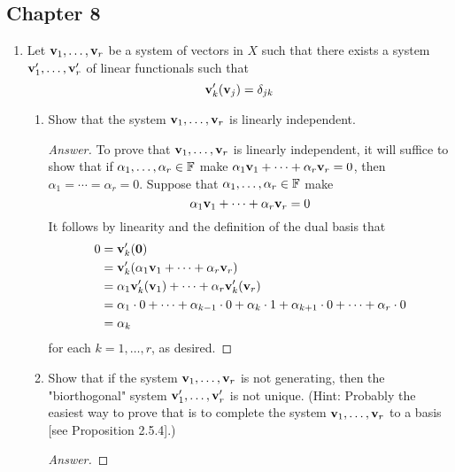 \documentclass[../psets.tex]{subfiles}
\begin{document}
\subsection*{Chapter 8}
\begin{enumerate}[label={\textbf{1.\arabic*.}}]
    \item Let $\mathbf{v}_1,\dots,\mathbf{v}_r$ be a system of vectors in $X$ such that there exists a system $\mathbf{v}_1',\dots,\mathbf{v}_r'$ of linear functionals such that
    \begin{equation*}
        \mathbf{v}_k'(\mathbf{v}_j) = \delta_{jk}
    \end{equation*}
    \begin{enumerate}
        \item Show that the system $\mathbf{v}_1,\dots,\mathbf{v}_r$ is linearly independent.
        \begin{proof}[Answer]
            To prove that $\mathbf{v}_1,\dots,\mathbf{v}_r$ is linearly independent, it will suffice to show that if $\alpha_1,\dots,\alpha_r\in\mathbb{F}$ make $\alpha_1\mathbf{v}_1+\cdots+\alpha_r\mathbf{v}_r=0$, then $\alpha_1=\cdots=\alpha_r=0$. Suppose that $\alpha_1,\dots,\alpha_r\in\mathbb{F}$ make
            \begin{equation*}
                \alpha_1\mathbf{v}_1+\cdots+\alpha_r\mathbf{v}_r = 0
            \end{equation*}
            It follows by linearity and the definition of the dual basis that
            \begin{align*}
                0 &= \mathbf{v}_k'(\bm{0})\\
                &= \mathbf{v}_k'(\alpha_1\mathbf{v}_1+\cdots+\alpha_r\mathbf{v}_r)\\
                &= \alpha_1\mathbf{v}_k'(\mathbf{v}_1)+\cdots+\alpha_r\mathbf{v}_k'(\mathbf{v}_r)\\
                &= \alpha_1\cdot 0+\cdots+\alpha_{k-1}\cdot 0+\alpha_k\cdot 1+\alpha_{k+1}\cdot 0+\cdots+\alpha_r\cdot 0\\
                &= \alpha_k
            \end{align*}
            for each $k=1,\dots,r$, as desired.
        \end{proof}
        \item Show that if the system $\mathbf{v}_1,\dots,\mathbf{v}_r$ is not generating, then the "biorthogonal" system $\mathbf{v}_1',\dots,\mathbf{v}_r'$ is not unique. (Hint: Probably the easiest way to prove that is to complete the system $\mathbf{v}_1,\dots,\mathbf{v}_r$ to a basis [see Proposition 2.5.4].)
        \begin{proof}[Answer]

\end{proof}
\end{enumerate}
\end{enumerate}
\end{document}
